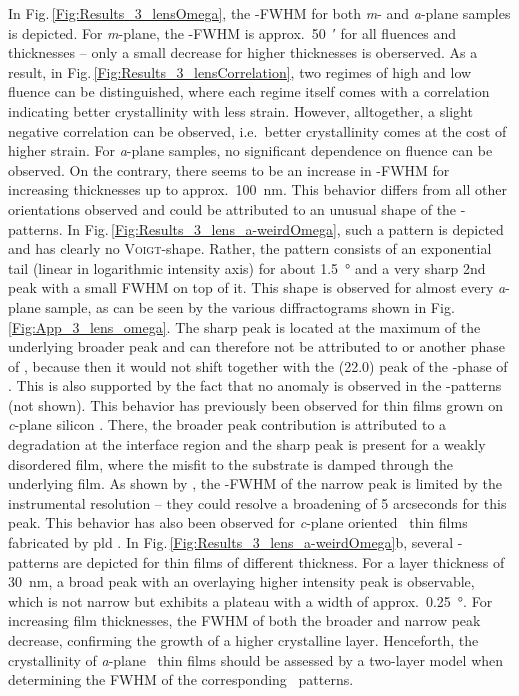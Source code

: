 In Fig.\,\ref{Fig:Results_3_lensOmega}, the \textomega-FWHM for both \textit{m}- and \textit{a}-plane samples is depicted.
For \textit{m}-plane, the \textomega-FWHM is approx.\ \qty{50}{\arcminute} for all fluences and thicknesses -- only a small decrease for higher thicknesses is oberserved.
As a result, in Fig.\,\ref{Fig:Results_3_lensCorrelation}, two regimes of high and low fluence can be distinguished, where each regime itself comes with a correlation indicating better crystallinity with less strain.
However, alltogether, a slight negative correlation can be observed, i.e.\ better crystallinity comes at the cost of higher strain.
For \textit{a}-plane samples, no significant dependence on fluence can be observed.
On the contrary, there seems to be an increase in \textomega-FWHM for increasing thicknesses up to approx.\ \qty{100}{\nm}.
This behavior differs from all other orientations observed and could be attributed to an unusual shape of the \textomega-patterns.
In Fig.\,\ref{Fig:Results_3_lens_a-weirdOmega}, such a pattern is depicted and has clearly no \textsc{Voigt}-shape.
Rather, the pattern consists of an exponential tail (linear in logarithmic intensity axis) for about \qty{1.5}{\degree} and a very sharp 2nd peak with a small \gls{FWHM} on top of it.
This shape is observed for almost every \textit{a}-plane sample, as can be seen by the various diffractograms shown in Fig.\,\ref{Fig:App_3_lens_omega}.
The sharp peak is located at the maximum of the underlying broader peak and can therefore not be attributed to  or another phase of \cro, because then it would not shift together with the (22.0) peak of the \textalpha-phase of \cro.
This is also supported by the fact that no anomaly is observed in the \thetaomega-patterns (not shown).
This behavior has previously been observed for  thin films grown on \textit{c}-plane silicon
    \cite{cho2005,durand2011}.
There, the broader peak contribution is attributed to a degradation at the interface region
    \cite{cho2005}
and the sharp peak is present for a weakly disordered film, where the misfit to the substrate is damped through the underlying film.
As shown by \textcite{durand2011}, the \textomega-FWHM of the narrow peak is limited by the instrumental resolution -- they could resolve a broadening of 5 arcseconds for this peak.
This behavior has also been observed for \textit{c}-plane oriented \cro\ thin films fabricated by \acrshort{pld}
    \cite{arca2017}.
In Fig.\,\ref{Fig:Results_3_lens_a-weirdOmega}b, several \textomega-patterns are depicted for thin films of different thickness.
For a layer thickness of \qty{30}{\nm}, a broad peak with an overlaying higher intensity peak is observable, which is not narrow but exhibits a plateau with a width of approx.\ \qty{0.25}{\degree}.
For increasing film thicknesses, the FWHM of both the broader and narrow peak decrease, confirming the growth of a higher crystalline layer.
Henceforth, the crystallinity of \textit{a}-plane \cro\ thin films should be assessed by a two-layer model when determining the FWHM of the corresponding \textomega\ patterns.

